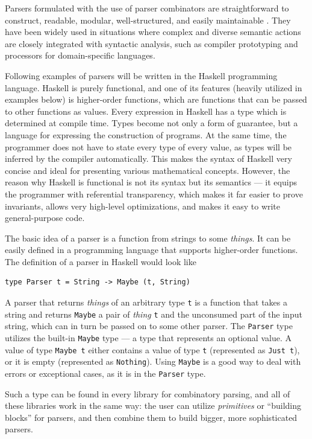 \documentclass[english,bachelors,forcepolishlogotype]{wizthesis}
\begin{document}
Parsers formulated with the use of parser combinators are straightforward to
construct, readable, modular, well-structured, and easily maintainable
\cite{swierstra-2009}. They have been widely used in situations where complex
and diverse semantic actions are closely integrated with syntactic analysis,
such as compiler prototyping and processors for domain-specific languages.

Following examples of parsers will be written in the Haskell \cite{haskell}
programming language. Haskell is purely functional, and one of its features
(heavily utilized in examples below) is higher-order functions, which are
functions that can be passed to other functions as values. Every expression in
Haskell has a type which is determined at compile time. Types become not only a
form of guarantee, but a language for expressing the construction of programs.
At the same time, the programmer does not have to state every type of every
value, as types will be inferred by the compiler automatically. This makes the
syntax of Haskell very concise and ideal for presenting various mathematical
concepts. However, the reason why Haskell is functional is not its syntax but
its semantics --- it equips the programmer with referential transparency, which
makes it far easier to prove invariants, allows very high-level optimizations,
and makes it easy to write general-purpose code.

The basic idea of a parser is a function from strings to some \emph{things}. It
can be easily defined in a programming language that supports higher-order
functions. The definition of a parser in Haskell would look like
\begin{verbatim}
type Parser t = String -> Maybe (t, String)
\end{verbatim}
A parser that returns \emph{things} of an arbitrary type \texttt{t} is a
function that takes a string and returns \texttt{Maybe} a pair of \emph{thing}
\texttt{t} and the unconsumed part of the input string, which can in turn be
passed on to some other parser. The \texttt{Parser} type utilizes the built-in
\texttt{Maybe} type --- a type that represents an optional value. A value of
type \texttt{Maybe t} either contains a value of type \texttt{t} (represented as
\texttt{Just t}), or it is empty (represented as \texttt{Nothing}). Using
\texttt{Maybe} is a good way to deal with errors or exceptional cases, as it is
in the \texttt{Parser} type.

Such a type can be found in every library for combinatory parsing, and all of
these libraries work in the same way: the user can utilize \emph{primitives} or
``building blocks'' for parsers, and then combine them to build bigger, more
sophisticated parsers.
\end{document}
